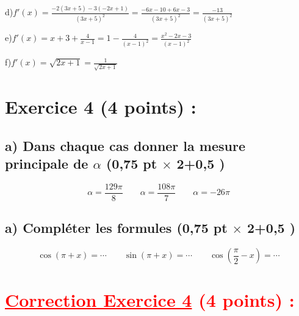 \documentclass[12pt]{article}
\begin{document}
d)$f'(x)=\frac{-2(3x+5)-3(-2x+1)}{(3x+5)^{2}}=\frac{-6x-10+6x-3}{(3x+5)^{2}}=\frac{-13}{(3x+5)^{2}}$

e)$f'(x)=x+3+\frac{4}{x-1}=1-\frac{4}{(x-1)^{2}}=\frac{x^{2}-2x-3}{(x-1)^{2}}$

f)$f'(x)=\sqrt{2x+1}=\frac{1}{\sqrt{2x+1}}$
\section*{Exercice 4 (4 points) :}
\subsection*{a) Dans chaque cas donner la mesure principale de $\alpha$ (0,75 pt $\times$ 2+0,5 )}
\[\alpha =\frac{129\pi}{8}\quad\quad \alpha =\frac{108\pi}{7}\quad\quad \alpha = -26\pi \]
\subsection*{a) Compléter les formules (0,75 pt $\times$ 2+0,5 )}
\[\cos(\pi+x)=\cdots\quad\quad \sin(\pi+x)=\cdots\quad\quad \cos(\frac{\pi}{2}-x)=\cdots\]
\section*{\textcolor{red}{\underline{Correction Exercice 4} (4 points) :}}
\end{document}
